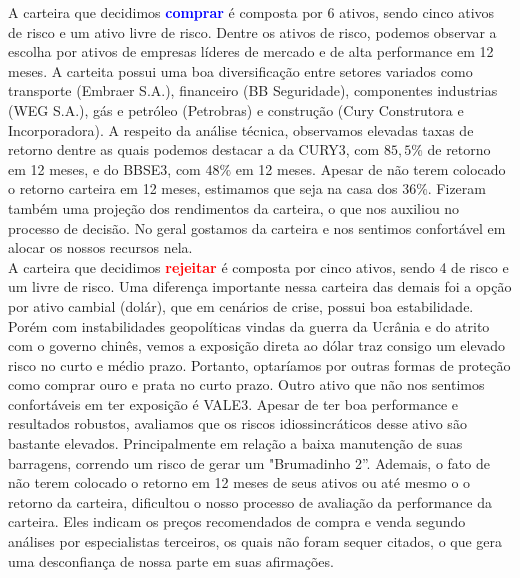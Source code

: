 \documentclass[letterpaper,12pt]{article}
\begin{document}
\noindent A carteira que decidimos \textcolor{blue}{\textbf{comprar}} é composta por 6 ativos, sendo cinco ativos de risco e um ativo livre de risco. Dentre os ativos de risco, podemos observar a escolha por ativos de empresas líderes de mercado e de alta performance em 12 meses. A carteita possui uma boa diversificação entre setores variados como transporte (Embraer S.A.), financeiro (BB Seguridade), componentes industrias (WEG S.A.), gás e petróleo (Petrobras) e construção (Cury Construtora e Incorporadora). A respeito da análise técnica, observamos elevadas taxas de retorno dentre as quais podemos destacar a da CURY3, com $85,5\%$ de retorno em 12 meses, e do BBSE3, com $48\%$ em 12 meses. Apesar de não terem colocado o retorno carteira em 12 meses, estimamos que seja na casa dos $36\%$. Fizeram também uma projeção dos rendimentos da carteira, o que nos auxiliou no processo de decisão. No geral gostamos da carteira e nos sentimos confortável em alocar os nossos recursos nela.\\

\noindent A carteira que decidimos \textcolor{red}{\textbf{rejeitar}} é composta por cinco ativos, sendo 4 de risco e um livre de risco. Uma diferença importante nessa carteira das demais foi a opção por ativo cambial (dolár), que em cenários de crise, possui boa estabilidade. Porém com instabilidades geopolíticas vindas da guerra da Ucrânia e do atrito com o governo chinês, vemos a exposição direta ao dólar traz consigo um elevado risco no curto e médio prazo. Portanto, optaríamos por outras formas de proteção como comprar ouro e prata no curto prazo. Outro ativo que não nos sentimos confortáveis em ter exposição é VALE3. Apesar de ter boa performance e resultados robustos, avaliamos que os riscos idiossincráticos desse ativo são bastante elevados. Principalmente em relação a baixa manutenção de suas barragens, correndo um risco de gerar um "Brumadinho 2''. Ademais, o fato de não terem colocado o retorno em 12 meses de seus ativos ou até mesmo o o retorno da carteira, dificultou o nosso processo de avaliação da performance da carteira. Eles indicam os preços recomendados de compra e venda segundo análises por especialistas terceiros, os quais não foram sequer citados, o que gera uma desconfiança de nossa parte em suas afirmações.
\end{document}
